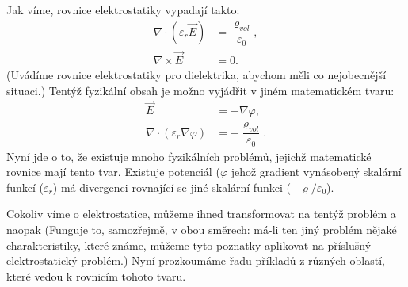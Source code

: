     Jak víme, rovnice elektrostatiky vypadají takto:
    \begin{subequations}
      \begin{align}
         \nabla\cdot(\varepsilon_r\vec{E})&=\dfrac{\varrho_{vol}}{\varepsilon_0},\label{fyz:eq756}\\  
         \nabla\times\vec{E}              &= 0.                                  \label{fyz:eq757}
      \end{align}
    \end{subequations}
    (Uvádíme rovnice elektrostatiky pro dielektrika, abychom měli co nejobecnější situaci.) Tentýž
    fyzikální obsah je možno vyjádřit v jiném matematickém tvaru:
    \begin{subequations}
      \begin{align}
         \vec{E}  &=-\nabla\varphi,                                      \label{fyz:eq758}\\  
         \nabla\cdot(\varepsilon_r\nabla\varphi)
                  &=-\dfrac{\varrho_{vol}}{\varepsilon_0}.               \label{fyz:eq759}
      \end{align}
    \end{subequations}
    Nyní jde o to, že existuje mnoho fyzikálních problémů, jejichž matematické rovnice mají tento
    tvar. Existuje potenciál (\(\varphi\) jehož gradient vynásobený skalární funkcí
    (\(\varepsilon_r\)) má divergenci rovnající se jiné skalární funkci
    (\(-\varrho/\varepsilon_0\)).

    Cokoliv víme o elektrostatice, můžeme ihned transformovat na tentýž problém a naopak (Fun­guje
    to, samozřejmě, v obou směrech: má-li ten jiný problém nějaké charakteristiky, které známe,
    můžeme tyto poznatky aplikovat na příslušný elektrostatický problém.) Nyní prozkoumáme řadu
    příkladů z různých oblastí, které vedou k rovnicím tohoto tvaru.

    
